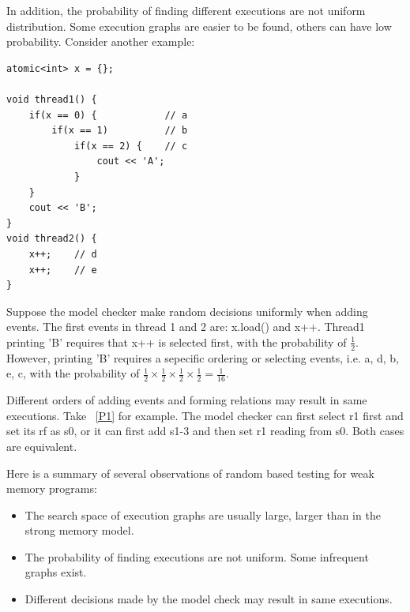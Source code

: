
In addition, the probability of finding different executions are not uniform distribution. Some execution graphs are easier to be found, others can have low probability. Consider another example:
\begin{lstlisting}[caption={P2}, label={P2}]
atomic<int> x = {};

void thread1() {
    if(x == 0) {            // a
        if(x == 1)          // b
            if(x == 2) {    // c 
                cout << 'A';
            }
    }
    cout << 'B';
}
void thread2() {
    x++;    // d
    x++;    // e
}
\end{lstlisting}

Suppose the model checker make random decisions uniformly when adding events. The first events in thread 1 and 2 are: x.load() and x++. Thread1 printing 'B' requires that x++ is selected first, with the probability of $\frac{1}{2}$. However, printing 'B' requires a sepecific ordering or selecting events, i.e. {a, d, b, e, c}, with the probability of $\frac{1}{2} \times \frac{1}{2}  \times \frac{1}{2}  \times \frac{1}{2} =  \frac{1}{16}$.


Different orders of adding events and forming relations may result in same executions. Take ~\ref{P1} for example. The model checker can first select r1 first and set its rf as s0, or it can first add s1-3 and then set r1 reading from s0. Both cases are equivalent.

Here is a summary of several observations of random based testing for weak memory programs:
\begin{itemize}
    \item The search space of execution graphs are usually large, larger than in the strong memory model.
    \item The probability of finding executions are not uniform. Some infrequent graphs exist.
    \item Different decisions made by the model check may result in same executions.
\end{itemize}

